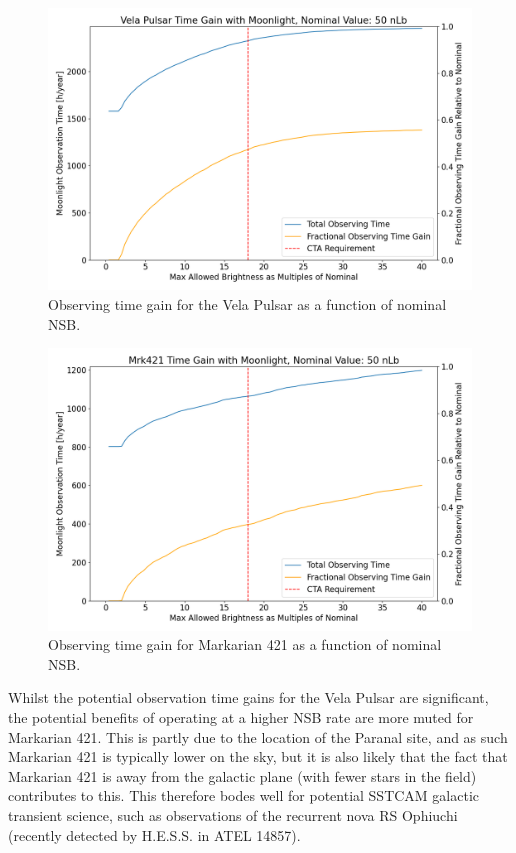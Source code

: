 \begin{figure}[h!]
\begin{centering}
\includegraphics[width=\columnwidth]{./figures/obstime_VelaPulsar_nom.png}
\caption{Observing time gain for the Vela Pulsar as a function of nominal NSB.}
\label{fig:obstimegainvelapulsar}
\end{centering}
\end{figure}

\begin{figure}[h!]
\begin{centering}
\includegraphics[width=\columnwidth]{./figures/obstime_mrk421_nom.png}
\caption{Observing time gain for Markarian 421 as a function of nominal NSB.}
\label{fig:obstimegainmrk421}
\end{centering}
\end{figure}

Whilst the potential observation time gains for the Vela Pulsar are significant, the potential benefits of operating at a higher NSB rate are more muted for Markarian 421. This is partly due to the location of the Paranal site, and as such Markarian 421 is typically lower on the sky, but it is also likely that the fact that Markarian 421 is away from the galactic plane (with fewer stars in the field) contributes to this. This therefore bodes well for potential SSTCAM galactic transient science, such as observations of the recurrent nova RS Ophiuchi (recently detected by H.E.S.S. in ATEL 14857). 

